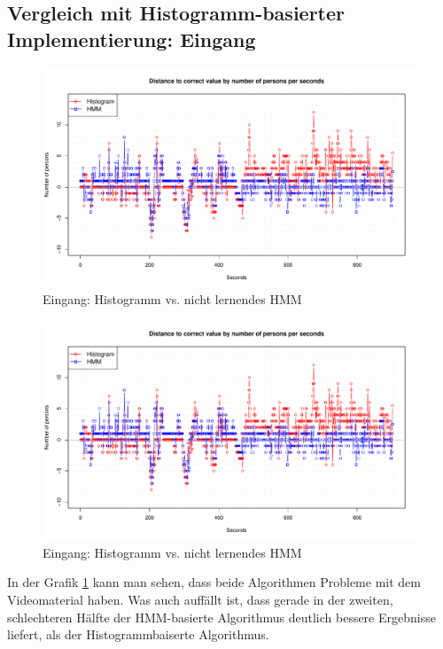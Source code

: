 \subsection{Vergleich mit Histogramm-basierter Implementierung: Eingang}
\label{sec:eval_eingang}
\begin{figure}
	\centering
\includegraphics[width=1\textwidth]{bilder/safest_plot_eingang2_nolearn.pdf}
	\caption{Eingang: Histogramm vs. nicht lernendes HMM}
	\label{fig:Eingang-nolearn}
\end{figure}
\begin{figure}
	\centering
\includegraphics[width=1\textwidth]{bilder/safest_plot_eingang2_nolearn.pdf}
	\caption{Eingang: Histogramm vs. nicht lernendes HMM}
	\label{fig:Eingang-learn}
\end{figure}
In der Grafik \ref{fig:Eingang-nolearn} kann man sehen, dass beide Algorithmen Probleme mit dem Videomaterial haben. Was auch auffällt ist, dass gerade in der zweiten, schlechteren Hälfte der HMM-basierte Algorithmus deutlich bessere Ergebnisse liefert, als der Histogrammbaiserte Algorithmus.\\


